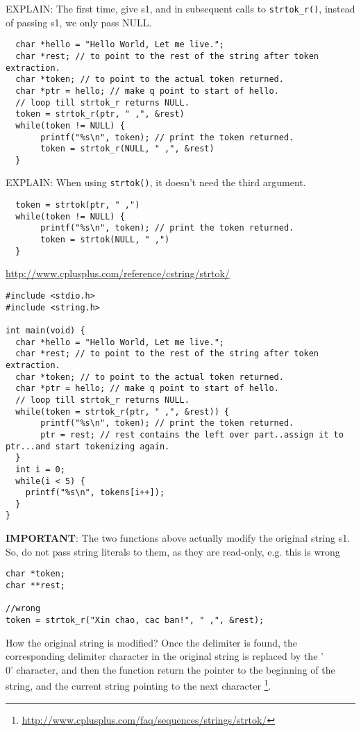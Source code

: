 \begin{mdframed}
EXPLAIN: The first time, give s1, and in subsequent calls to
\verb!strtok_r()!, instead of passing s1, we only pass NULL. 
\begin{verbatim}
  char *hello = "Hello World, Let me live.";
  char *rest; // to point to the rest of the string after token extraction.
  char *token; // to point to the actual token returned.
  char *ptr = hello; // make q point to start of hello.
  // loop till strtok_r returns NULL.
  token = strtok_r(ptr, " ,", &rest)
  while(token != NULL) {
       printf("%s\n", token); // print the token returned.
       token = strtok_r(NULL, " ,", &rest)    
  }
\end{verbatim}

EXPLAIN:
When using \verb!strtok()!, it doesn't need the
third argument.
\begin{verbatim}
  token = strtok(ptr, " ,")
  while(token != NULL) {
       printf("%s\n", token); // print the token returned.
       token = strtok(NULL, " ,")    
  }
\end{verbatim}
\url{http://www.cplusplus.com/reference/cstring/strtok/}

\end{mdframed}

\begin{verbatim}
#include <stdio.h>
#include <string.h>

int main(void) {
  char *hello = "Hello World, Let me live.";
  char *rest; // to point to the rest of the string after token extraction.
  char *token; // to point to the actual token returned.
  char *ptr = hello; // make q point to start of hello.
  // loop till strtok_r returns NULL.
  while(token = strtok_r(ptr, " ,", &rest)) {
       printf("%s\n", token); // print the token returned.
       ptr = rest; // rest contains the left over part..assign it to ptr...and start tokenizing again.    
  }
  int i = 0;
  while(i < 5) {
    printf("%s\n", tokens[i++]);
  }
}
\end{verbatim}

{\bf IMPORTANT}: The two functions above actually modify the original string s1. 
So, do not pass string literals to them, as they are read-only, e.g. this is
wrong
\begin{verbatim}
char *token;
char **rest;

//wrong
token = strtok_r("Xin chao, cac ban!", " ,", &rest);
\end{verbatim}
How the original string is modified? Once the delimiter is found, the
corresponding delimiter character in the original string is replaced by the
'\\0' character, and then the function return the pointer to the beginning of
the string, and the current string pointing to the next character
\footnote{\url{http://www.cplusplus.com/faq/sequences/strings/strtok/}}.

